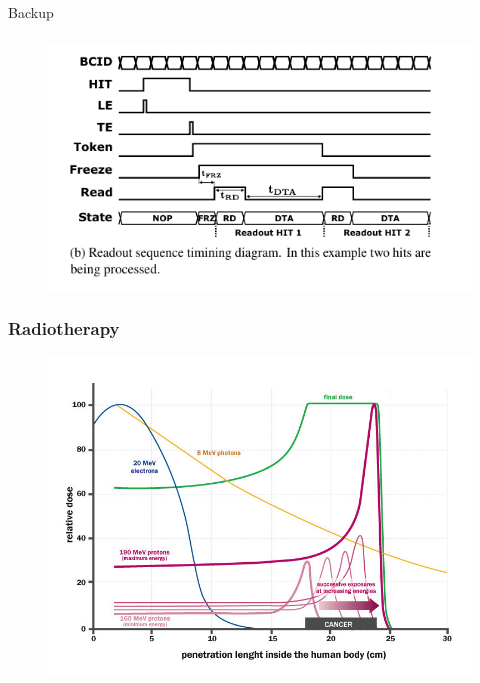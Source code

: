     \begin{frame}
        Backup        
    \end{frame} 

    

    \begin{frame}
        \frametitle{}
        \begin{figure}[h!]
            \centering
            \includegraphics[width=.8\linewidth]{figures/Monopix1/readout_timing.png}
        \end{figure}
    \end{frame} 

    \begin{frame}
        \frametitle{Radiotherapy}
        \begin{figure}[h!]
            \centering
            \includegraphics[width=.8\linewidth]{figures/pixel_detectors_usage/Bragg-Peak.png}
        \end{figure}
    \end{frame} 